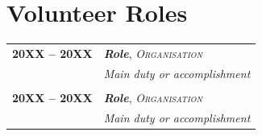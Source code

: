 \section{Volunteer Roles}
\begin{longtable}{@{}p{2.5cm}>{\raggedright\arraybackslash}p{16cm}@{}}
\textbf{20XX -- 20XX} & \textbf{\textit{Role}}, \textsc{\textit{Organisation}} \\
& \textit{Main duty or accomplishment} \\
& \\
\textbf{20XX -- 20XX} & \textbf{\textit{Role}}, \textsc{\textit{Organisation}} \\
& \textit{Main duty or accomplishment} \\
\end{longtable}
